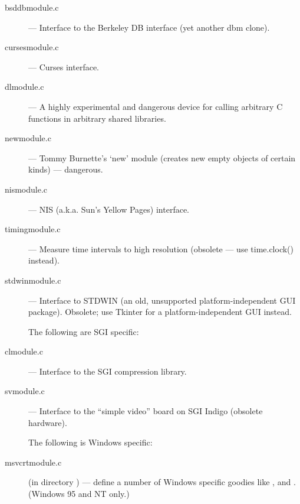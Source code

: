 \begin{description}
\item[bsddbmodule.c]
--- Interface to the Berkeley DB interface (yet another
dbm clone).

\item[cursesmodule.c]
--- Curses interface.

\item[dlmodule.c]
---  A highly experimental and dangerous device for calling
arbitrary C functions in arbitrary shared libraries.

\item[newmodule.c]
--- Tommy Burnette's `new' module (creates new empty objects of
certain kinds) --- dangerous.

\item[nismodule.c]
--- NIS (a.k.a. Sun's Yellow Pages) interface.

\item[timingmodule.c]
--- Measure time intervals to high resolution (obsolete --- use
time.clock() instead).

\item[stdwinmodule.c]
--- Interface to STDWIN (an old, unsupported
platform-independent GUI package).  Obsolete; use Tkinter for a
platform-independent GUI instead.

The following are SGI specific:

\item[clmodule.c]
--- Interface to the SGI compression library.

\item[svmodule.c]
--- Interface to the ``simple video'' board on SGI Indigo
(obsolete hardware).

The following is Windows specific:

\item[msvcrtmodule.c]
(in directory ) --- define a number of Windows
specific goodies like ,  and
.  (Windows 95 and NT only.)
\end{description}
